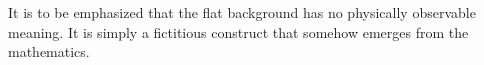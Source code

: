 \documentclass[twocolumn,showpacs,preprintnumbers,amsmath,amssymb,prb]{revtex4}
\begin{document}
It is to be emphasized that
the flat background has no physically observable meaning.
It is simply a fictitious construct
that somehow emerges from the mathematics.

%
%
%
%
%
\end{document}
